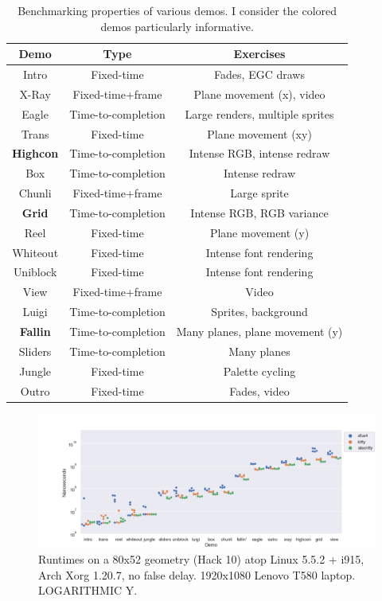 \begin{table}[!htbp]
  \centering
  \begin{tabular}{ |c|c|c| }
    \hline
    Demo & Type & Exercises \\
    \hline
    \hline
    Intro & Fixed-time & Fades, EGC draws \\
    \hline
    X-Ray & Fixed-time+frame & Plane movement (x), video \\
    \hline
    Eagle & Time-to-completion & Large renders, multiple sprites \\
    \hline
    Trans & Fixed-time & Plane movement (xy) \\
    \hline
    \rowcolor{blue!25}
    \textbf{Highcon} & Time-to-completion & Intense RGB, intense redraw \\
    \hline
    Box & Time-to-completion & Intense redraw \\
    \hline
    Chunli & Fixed-time+frame & Large sprite \\
    \hline
    \rowcolor{blue!25}
    \textbf{Grid} & Time-to-completion & Intense RGB, RGB variance \\
    \hline
    Reel & Fixed-time & Plane movement (y) \\
    \hline
    Whiteout & Fixed-time & Intense font rendering \\
    \hline
    Uniblock & Fixed-time & Intense font rendering \\
    \hline
    View & Fixed-time+frame & Video \\
    \hline
    Luigi & Time-to-completion & Sprites, background \\
    \hline
    \rowcolor{blue!25}
    \textbf{Fallin} & Time-to-completion & Many planes, plane movement (y) \\
    \hline
    Sliders & Time-to-completion & Many planes \\
    \hline
    Jungle & Fixed-time & Palette cycling \\
    \hline
    Outro & Fixed-time & Fades, video \\
    \hline
  \end{tabular}
\caption[Benchmarking properties of various demos.]{Benchmarking properties of
  various demos. I consider the colored demos particularly informative.}
\label{table:benchmarks}
\end{table}


\begin{figure}
\centering
\includegraphics[width=1\textwidth]{media/nvidia-80x52.png}
\caption[80x52 Intel i7-8550U benchmarks.]{Runtimes on a 80x52 geometry (Hack 10) atop Linux 5.5.2 + i915, Arch Xorg 1.20.7, no false delay. 1920x1080 Lenovo T580 laptop. LOGARITHMIC Y.}
\label{fig:nvidia-full}
\end{figure}

